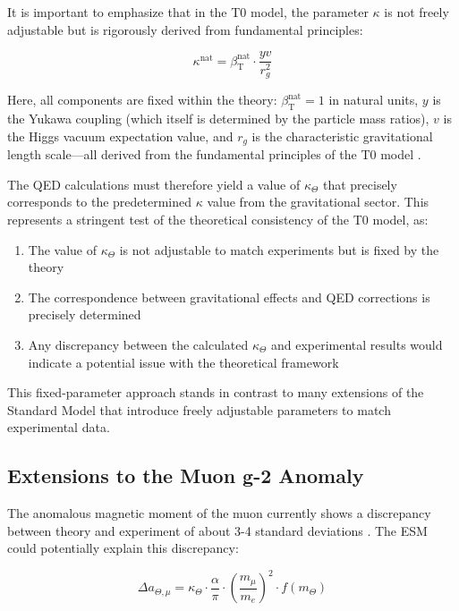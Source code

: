 \documentclass[12pt,a4paper]{article}
\newcommand{\betaT}{\beta_{\text{T}}}
\begin{document}
	It is important to emphasize that in the T0 model, the parameter $\kappa$ is not freely adjustable but is rigorously derived from fundamental principles:
	
	\begin{equation}
		\kappa^{\text{nat}} = \betaT^{\text{nat}} \cdot \frac{yv}{r_g^2}
	\end{equation}
	
	Here, all components are fixed within the theory: $\betaT^{\text{nat}} = 1$ in natural units, $y$ is the Yukawa coupling (which itself is determined by the particle mass ratios), $v$ is the Higgs vacuum expectation value, and $r_g$ is the characteristic gravitational length scale—all derived from the fundamental principles of the T0 model \cite{pascher_params_2025, pascher_alphabeta_2025}.
	
	The QED calculations must therefore yield a value of $\kappa_{\Theta}$ that precisely corresponds to the predetermined $\kappa$ value from the gravitational sector. This represents a stringent test of the theoretical consistency of the T0 model, as:
	
	\begin{enumerate}
		\item The value of $\kappa_{\Theta}$ is not adjustable to match experiments but is fixed by the theory
		\item The correspondence between gravitational effects and QED corrections is precisely determined
		\item Any discrepancy between the calculated $\kappa_{\Theta}$ and experimental results would indicate a potential issue with the theoretical framework
	\end{enumerate}
	
	This fixed-parameter approach stands in contrast to many extensions of the Standard Model that introduce freely adjustable parameters to match experimental data.
	
	\subsection{Extensions to the Muon g-2 Anomaly}
	\label{subsec:muon_g2}
	
	The anomalous magnetic moment of the muon currently shows a discrepancy between theory and experiment of about 3-4 standard deviations \cite{Muong-2:2021ojo}. The ESM could potentially explain this discrepancy:
	
	\begin{equation}
		\Delta a_{\Theta,\mu} = \kappa_{\Theta} \cdot \frac{\alpha}{\pi} \cdot \left(\frac{m_{\mu}}{m_e}\right)^2 \cdot f(m_{\Theta})
		\label{eq:muon_correction}
	\end{equation}
	
\end{document}
